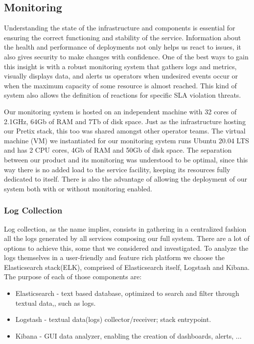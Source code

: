 \documentclass[12pt]{article}
\begin{document}
\subsection{Monitoring} \label{management.monitoring} %


Understanding the state of the infrastructure and components is essential for ensuring the correct functioning and stability of the service.
Information about the health and performance of deployments not only helps us react to issues, it also gives security to make changes with confidence. 
One of the best ways to gain this insight is with a robust monitoring system that gathers logs and metrics, visually displays data, and alerts us operators when 
undesired events occur or when the maximum capacity of some resource is almost reached.
This kind of system also allows the definition of reactions for specific SLA violation threats.

Our monitoring system is hosted on an independent machine with 32 cores of 2.1GHz, 64Gb of RAM and 7Tb of disk space.
Just as the infrastructure hosting our Pretix stack, this too was shared amongst other operator teams.
The virtual machine (VM) we instantiated for our monitoring system runs Ubuntu 20.04 LTS and has 2 CPU cores, 4Gb of RAM and 50Gb of disk space.
The separation between our product and its monitoring was understood to be optimal, since this way there is no added load to the service facility, keeping its
resources fully dedicated to itself.
There is also the advantage of allowing the deployment of our system both with or without monitoring enabled.

\subsubsection{Log Collection}
Log collection, as the name implies, consists in gathering in a centralized fashion all the logs generated by all services composing our full system. There are a lot of options to achieve this, some that we considered and investigated. To analyze the logs themselves in a user-friendly and feature rich platform we choose the Elasticsearch stack(ELK), comprised of Elasticsearch itself, Logstash and Kibana. The purpose of each of those components are:

\begin{itemize}
  \item Elasticsearch - text based database, optimized to search and filter through textual data,, such as logs.
  \item Logstash - textual data(logs) collector/receiver; stack entrypoint.
  \item Kibana - GUI data analyzer, enabling the creation of dashboards, alerts, ...
\end{itemize}
\end{document}
